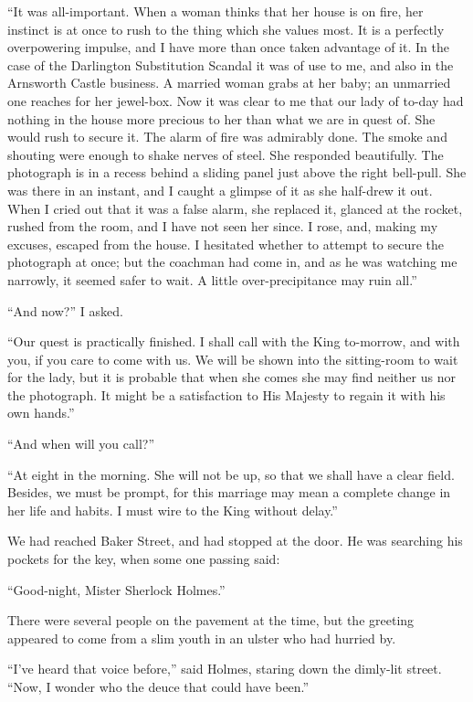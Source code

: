 “It was all-important. When a woman thinks that her
house is on fire, her instinct is at once to rush to the thing
which she values most. It is a perfectly overpowering impulse,
and I have more than once taken advantage of it. In
the case of the Darlington Substitution Scandal it was of use
to me, and also in the Arnsworth Castle business. A married
woman grabs at her baby; an unmarried one reaches for her
jewel-box. Now it was clear to me that our lady of to-day
had nothing in the house more precious to her than what we
are in quest of. She would rush to secure it. The alarm of
fire was admirably done. The smoke and shouting were
enough to shake nerves of steel. She responded beautifully.
The photograph is in a recess behind a sliding panel just
above the right bell-pull. She was there in an instant, and I
caught a glimpse of it as she half-drew it out. When I cried
out that it was a false alarm, she replaced it, glanced at the
rocket, rushed from the room, and I have not seen her since.
I rose, and, making my excuses, escaped from the house. I
hesitated whether to attempt to secure the photograph at
once; but the coachman had come in, and as he was watching
me narrowly, it seemed safer to wait. A little over-precipitance
may ruin all.”

“And now?” I asked.

“Our quest is practically finished. I shall call with the
King to-morrow, and with you, if you care to come with us.
We will be shown into the sitting-room to wait for the lady,
but it is probable that when she comes she may find neither
us nor the photograph. It might be a satisfaction to His
Majesty to regain it with his own hands.”

“And when will you call?”

“At eight in the morning. She will not be up, so that we
shall have a clear field. Besides, we must be prompt, for this
marriage may mean a complete change in her life and habits.
I must wire to the King without delay.”

We had reached Baker Street, and had stopped at the door.
He was searching his pockets for the key, when some one
passing said:

“Good-night, Mister Sherlock Holmes.”

There were several people on the pavement at the time, but
the greeting appeared to come from a slim youth in an ulster
who had hurried by.

“I’ve heard that voice before,” said Holmes, staring down
the dimly-lit street. “Now, I wonder who the deuce that
could have been.”


